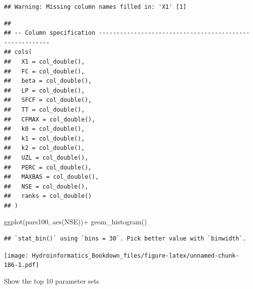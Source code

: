 \documentclass[
]{book}
\newenvironment{Shaded}{\begin{snugshade}}{\end{snugshade}}
\newcommand{\FunctionTok}[1]{\textcolor[rgb]{0.00,0.00,0.00}{#1}}
\newcommand{\NormalTok}[1]{#1}
\newcommand{\SpecialCharTok}[1]{\textcolor[rgb]{0.00,0.00,0.00}{#1}}
\begin{document}
\begin{verbatim}
## Warning: Missing column names filled in: 'X1' [1]
\end{verbatim}

\begin{verbatim}
## 
## -- Column specification --------------------------------------------------------
## cols(
##   X1 = col_double(),
##   FC = col_double(),
##   beta = col_double(),
##   LP = col_double(),
##   SFCF = col_double(),
##   TT = col_double(),
##   CFMAX = col_double(),
##   k0 = col_double(),
##   k1 = col_double(),
##   k2 = col_double(),
##   UZL = col_double(),
##   PERC = col_double(),
##   MAXBAS = col_double(),
##   NSE = col_double(),
##   ranks = col_double()
## )
\end{verbatim}

\begin{Shaded}
\begin{Highlighting}[]
\FunctionTok{ggplot}\NormalTok{(pars100, }\FunctionTok{aes}\NormalTok{(NSE))}\SpecialCharTok{+}
  \FunctionTok{geom\_histogram}\NormalTok{()}
\end{Highlighting}
\end{Shaded}

\begin{verbatim}
## `stat_bin()` using `bins = 30`. Pick better value with `binwidth`.
\end{verbatim}

\texttt{[image: Hydroinformatics\_Bookdown\_files/figure-latex/unnamed-chunk-186-1.pdf]}

Show the top 10 parameter sets
\end{document}
